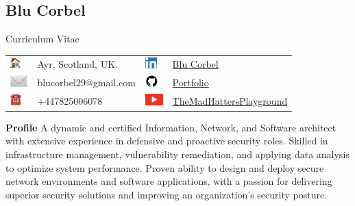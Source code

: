 \documentclass[12pt, a4paper]{article}
\begin{document}
 

\begin{center} 
\section*{Blu Corbel}{Curriculum Vitae} 
\end{center} 
\vspace{0.3cm}
\hspace{22mm}
\begin{tabularx}{\linewidth}{@{} lX lX @{}}
\includegraphics[height=1.2em]{Screenshot_20250820-133113.png} & Ayr, Scotland, UK. & 
\includegraphics[height=1.2em]{Screenshot_20250820-133930.png} & \href{https://www.linkedin.com/in/blu-corbel-bb5700265}{Blu Corbel} \\ 
\includegraphics[height=1.2em]{Screenshot_20250820-133313.png} & blucorbel29@gmail.com & 
\includegraphics[height=1.2em]{Screenshot_20250820-134301.png} & \href{https://github.com/DeadmanXXXII/Curriculum-Vitae/}{Portfolio} \\ 
\includegraphics[height=1.2em]{Screenshot_20250820-133153.png} & +447825006078 & 
\includegraphics[height=1.2em]{Screenshot_20250820-134014.png} & \href{https://youtube.com/@themadhattersplayground}{TheMadHattersPlayground}
\end{tabularx}

\vspace{0.3cm}
\textcolor{blue}{\hrulefill}
\vspace{0.2cm}

\textbf{Profile}
A dynamic and certified Information, Network, and Software architect with extensive experience in defensive and proactive security roles. Skilled in infrastructure management, vulnerability remediation, and applying data analysis to optimize system performance. Proven ability to design and deploy secure network environments and software applications, with a passion for delivering superior security solutions and improving an organization's security posture.
\end{document}
